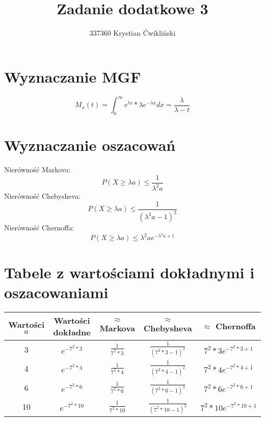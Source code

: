 \documentclass{article}
\title{Zadanie dodatkowe 3}
\author{337360 Krystian Ćwikliński}
\begin{document}
\maketitle

\section{Wyznaczanie MGF}
\begin{equation}
M_x(t) = \int_{0}^{\infty} e^{tx} * \lambda e^{-\lambda x}dx = \frac{\lambda}{\lambda - t}
\end{equation}

\section{Wyznaczanie oszacowań}
Nierówność Markova:
\begin{equation}
P(X \ge \lambda a) \le \frac{1}{\lambda^{2} a}
\end{equation}
Nierówność Chebysheva:
\begin{equation}
P(X \ge \lambda a) \le \frac{1}{(\lambda^{2} a - 1)^2}
\end{equation}
Nierówność Chernoffa:
\begin{equation}
P(X \ge \lambda a) \le \lambda^{2} a e^{-\lambda^{2} a + 1}
\end{equation}

\section{Tabele z wartościami dokładnymi i oszacowaniami}
\begin{table}[htbp]
    \centering
    \begin{tabular}{|c|cccc|}
        \hline
        Wartości $a$ & Wartości dokładne & $\approx$ Markova & $\approx$ Chebysheva & $\approx$ Chernoffa \\
        \hline
        3 & $e^{-7^{2} * 3}$ & $\frac{1}{7^2 * 3}$ & $\frac{1}{(7^2 * 3 - 1)^2}$ & $7^{2} * 3 e^{-7^{2} * 3 + 1}$ \\
        \hline
        4 & $e^{-7^{2} * 4}$ & $\frac{1}{7^2 * 4}$ & $\frac{1}{(7^2 * 4 - 1)^2}$ & $7^{2} * 4 e^{-7^{2} * 4 + 1}$ \\
        \hline
        6 & $e^{-7^{2} * 6}$ & $\frac{1}{7^2 * 6}$ & $\frac{1}{(7^2 * 6 - 1)^2}$ & $7^{2} * 6 e^{-7^{2} * 6 + 1}$ \\
        \hline
        10 & $e^{-7^{2} * 10}$ & $\frac{1}{7^2 * 10}$ & $\frac{1}{(7^2 * 10 - 1)^2}$ & $7^{2} * 10 e^{-7^{2} * 10 + 1}$ \\
        \hline
    \end{tabular}
\end{table}
\end{document}
